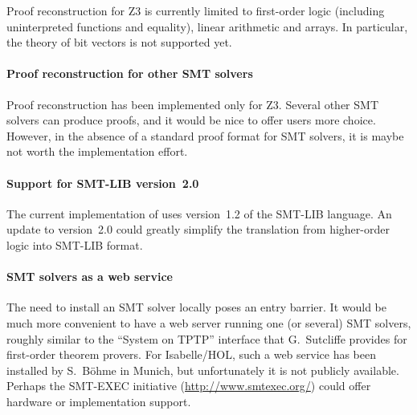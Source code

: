 Proof reconstruction for Z3 is currently limited to first-order logic
(including uninterpreted functions and equality), linear arithmetic
and arrays.  In particular, the theory of bit vectors is not supported
yet.

\paragraph{Proof reconstruction for other SMT solvers}

Proof reconstruction has been implemented only for Z3.  Several other
SMT solvers can produce proofs, and it would be nice to offer \HOL{}
users more choice.  However, in the absence of a standard proof format
for SMT solvers, it is maybe not worth the implementation effort.

\paragraph{Support for SMT-LIB version~2.0}

The current implementation of  uses version~1.2 of the
SMT-LIB language.  An update to version~2.0 could greatly simplify the
translation from higher-order logic into SMT-LIB format.

\paragraph{SMT solvers as a web service}

The need to install an SMT solver locally poses an entry barrier.  It
would be much more convenient to have a web server running one (or
several) SMT solvers, roughly similar to the ``System on TPTP''
interface that G.~Sutcliffe provides for first-order theorem provers.
For Isabelle/HOL, such a web service has been installed by
S.~B{\"o}hme in Munich, but unfortunately it is not publicly
available.  Perhaps the SMT-EXEC initiative
(\url{http://www.smtexec.org/}) could offer hardware or implementation
support.


